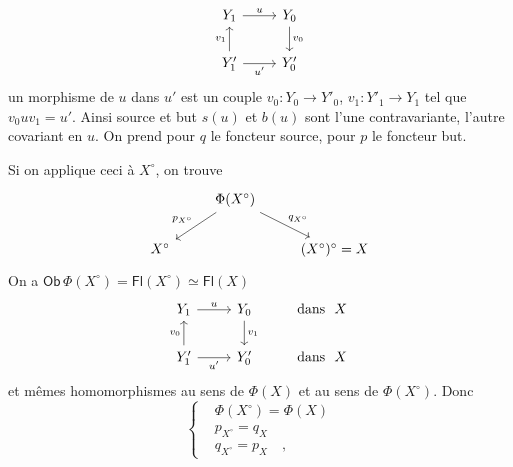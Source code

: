 \documentclass[11pt]{article}
\newcommand{\msp}[1]{\marginpar{\footnotesize [#1]}}
\newcommand{\Ob}{\mathsf{Ob}}
\newcommand{\Fl}{\mathsf{Fl}}
\begin{document}
\msp{page 73}
\[
\begin{tikzcd}
Y_1 \arrow[r, "u"] & Y_0 \arrow[d, "v_0"] \\
Y'_1 \arrow[u, "v_1"] \arrow[r, "u'"{swap}] & Y'_0
\end{tikzcd}
\]
un morphisme de $u$ dans $u'$ est un couple $v_0 : Y_0 \to Y'_0$, $v_1 : Y'_1 \to Y_1$ tel que $v_0uv_1 = u'$. Ainsi source et but $s(u)$ et $b(u)$ sont l'une contravariante, l'autre covariant en $u$. On prend pour $q$ le foncteur source, pour $p$ le foncteur but. %

Si on applique ceci à $X^{\circ}$, on trouve
\[
\begin{tikzcd}
& \Phi(X^{\circ}) \arrow[dl, "p_{X^{\circ}}"{swap}] \arrow[dr, "q_{X^{\circ}}"] & \\
X^{\circ} & & (X^{\circ})^{\circ} = X
\end{tikzcd}
\]
On a $\Ob\, \Phi(X^{\circ}) = \Fl(X^{\circ}) \simeq \Fl(X)$
\[
\begin{tikzcd}
Y_1 \arrow[r, "u"] & Y_0 \arrow[d, "v_1"] & \text{dans}\ \ X \\
Y'_1 \arrow[u, "v_0"] \arrow[r, "u'"{swap}] & Y'_0 & \text{dans}\ \ X
\end{tikzcd}
\]
et mêmes homomorphismes au sens de $\Phi(X)$ et au sens de $\Phi(X^{\circ})$. Donc
\[
\left\{
\begin{aligned}
&\Phi(X^{\circ}) = \Phi(X) \\
&p_{X^{\circ}} = q_X \\
&q_{X^{\circ}} = p_X \quad ,
\end{aligned}
\right.
\]
\end{document}
